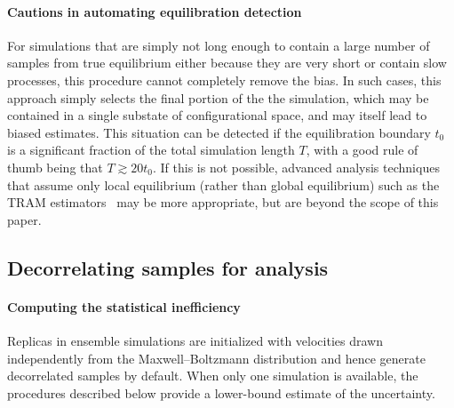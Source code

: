 \documentclass[9pt,bestpractices]{livecoms}
\begin{document}
\paragraph{Cautions in automating equilibration detection}
For simulations that are simply not long enough to contain a large number of samples from true equilibrium either because they are very short or contain slow processes, this procedure cannot completely remove the bias.
In such cases, this approach simply selects the final portion of the the simulation, which may be contained in a single substate of configurational space, and may itself lead to biased estimates. 
This situation can be detected if the equilibration boundary $t_0$ is a significant fraction of the total simulation length $T$, with a good rule of thumb being that $T \gtrsim 20 t_0$.
If this is not possible, advanced analysis techniques that assume only local equilibrium (rather than global equilibrium) such as the TRAM estimators~\cite{mey2014xtram,wu2016multiensemble,nuske2017markov} may be more appropriate, but are beyond the scope of this paper.


\subsection{Decorrelating samples for analysis}
\label{sec:decorrelating-samples}
\paragraph{Computing the statistical inefficiency}
Replicas in ensemble simulations are initialized with velocities drawn independently from the Maxwell–Boltzmann distribution and hence generate decorrelated samples by default. When only one simulation is available, the procedures described below provide a lower-bound estimate of the uncertainty.
\end{document}
